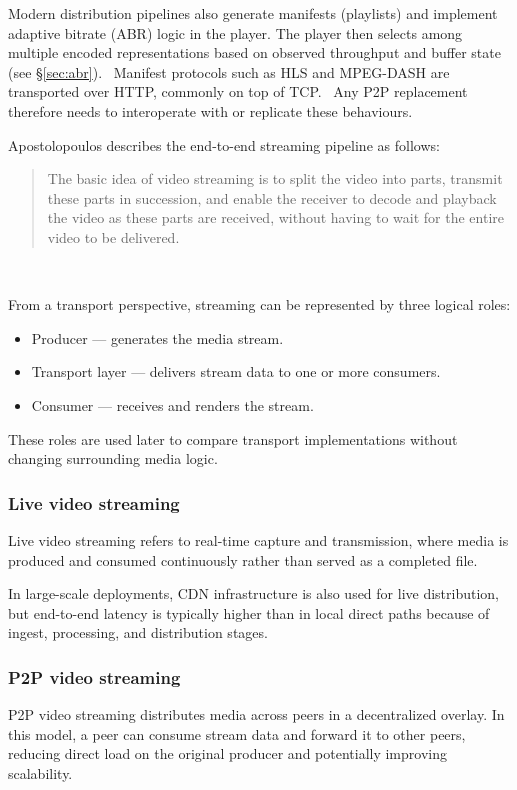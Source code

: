 Modern distribution pipelines also generate manifests (playlists) and implement adaptive bitrate (\ac{ABR}) logic in the player. The player then selects among multiple encoded representations based on observed throughput and buffer state (see \S\ref{sec:abr}).~\cite{peroniEndtoEndPipelinePerspective2025} Manifest protocols such as HLS and MPEG-DASH are transported over HTTP, commonly on top of TCP.~\cite{pantos_http_2017,noauthor_standards_nodate} Any \ac{P2P} replacement therefore needs to interoperate with or replicate these behaviours.

Apostolopoulos describes the end-to-end streaming pipeline as follows:
\begin{quote}
The basic idea of video streaming is to split the video
into parts, transmit these parts in succession, and enable the receiver to
decode and playback the video as these parts are received, without having to
wait for the entire video to be delivered.
\end{quote}~\cite{apostolopoulosVideoStreamingConcepts}

From a transport perspective, streaming can be represented by three logical roles:
\begin{itemize}
    \item Producer --- generates the media stream.
    \item Transport layer --- delivers stream data to one or more consumers.
    \item Consumer --- receives and renders the stream.
\end{itemize}
These roles are used later to compare transport implementations without changing surrounding media logic.~\cite{apostolopoulosVideoStreamingConcepts}

\subsubsection{Live video streaming}
Live video streaming refers to real-time capture and transmission, where media is produced and consumed continuously rather than served as a completed file.

In large-scale deployments, \ac{CDN} infrastructure is also used for live distribution, but end-to-end latency is typically higher than in local direct paths because of ingest, processing, and distribution stages.~\cite{peroniEndtoEndPipelinePerspective2025}
\subsubsection{\ac{P2P} video streaming}
\ac{P2P} video streaming distributes media across peers in a decentralized overlay. In this model, a peer can consume stream data and forward it to other peers, reducing direct load on the original producer and potentially improving scalability.


